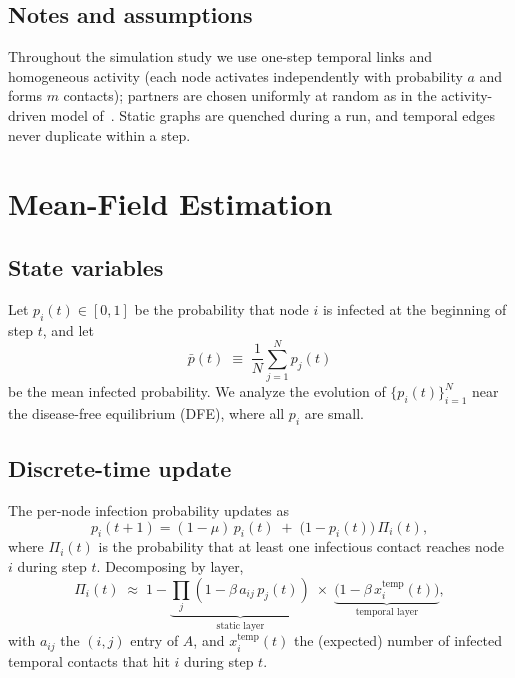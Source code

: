 \documentclass[pdflatex,sn-mathphys-num]{sn-jnl}%
\theoremstyle{thmstyleone}%
\theoremstyle{thmstyletwo}%
\theoremstyle{thmstylethree}%
\begin{document}
\subsection{Notes and assumptions}
Throughout the simulation study we use one-step temporal links and homogeneous activity (each node activates independently with probability $a$ and forms $m$ contacts); partners are chosen uniformly at random as in the activity-driven model of~\cite{Perra2012}. Static graphs are quenched during a run, and temporal edges never duplicate within a step.

\section{Mean-Field Estimation}
\label{sec:main}

\subsection{State variables}
Let $p_i(t)\in[0,1]$ be the probability that node $i$ is infected at the beginning of step $t$, and let
\[
\bar p(t)\;\equiv\;\frac{1}{N}\sum_{j=1}^N p_j(t)
\]
be the mean infected probability. We analyze the evolution of $\{p_i(t)\}_{i=1}^N$ near the disease-free equilibrium (DFE), where all $p_i$ are small.

\subsection{Discrete-time update}
The per-node infection probability updates as
\begin{equation}
p_i(t{+}1)
= (1-\mu)\,p_i(t)\;+\;\big(1-p_i(t)\big)\,\Pi_i(t),
\label{eq:model-dt-exact}
\end{equation}
where $\Pi_i(t)$ is the probability that at least one infectious contact reaches node $i$ during step $t$.
Decomposing by layer,
\begin{equation}
\Pi_i(t)
\;\approx\; 1-\underbrace{\prod_{j}(1-\beta\,a_{ij}\,p_j(t))}_{\text{static layer}}
\;\times\;
\underbrace{\big(1-\beta\,x_i^{\mathrm{temp}}(t)\big)}_{\text{temporal layer}},
\label{eq:model-Pi}
\end{equation}
with $a_{ij}$ the $(i,j)$ entry of $A$, and $x_i^{\mathrm{temp}}(t)$ the (expected) number of infected temporal contacts that hit $i$ during step $t$.
\end{document}
